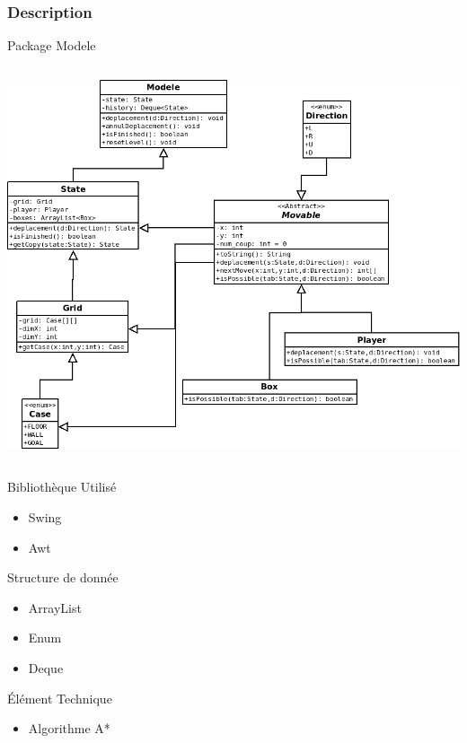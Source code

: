 \documentclass{beamer}
\begin{document}
\begin{frame}
\frametitle{Description}
\begin{exampleblock}{Package Modele}
\hspace{2.2cm}
\begin{column}{8cm}
  \includegraphics[scale=0.2]{Diagramme3.png}
\end{column}
\end{exampleblock}

\end{frame}

\begin{frame}
\begin{alertblock}{Bibliothèque Utilisé} 
\begin{itemize}
    \item Swing
    \item Awt
\end{itemize}
\end{alertblock}
\begin{alertblock}{Structure de donnée} 
\begin{itemize}
    \item ArrayList
    \item Enum
    \item Deque
\end{itemize}
\end{alertblock}
\end{frame}
\begin{frame}
\begin{exampleblock}{Élément Technique} 
\begin{itemize}
    \item Algorithme A*
\end{itemize}
\end{exampleblock}
\end{frame}
\end{document}
